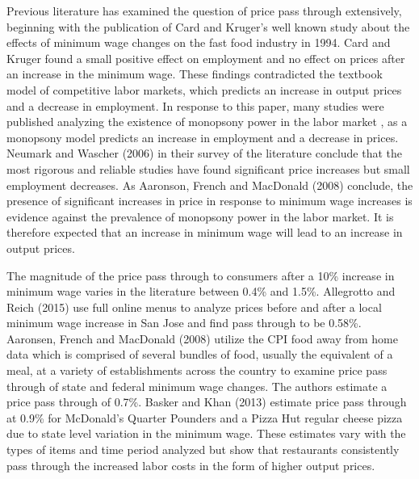 \documentclass[11pt]{article}
\begin{document}
Previous literature has examined the question of price pass through extensively, beginning with the publication of Card and Kruger's well known study about the effects of minimum wage changes on the fast food industry in 1994\nocite{card1994minimum}. Card and Kruger found a small positive effect on employment and no effect on prices after an increase in the minimum wage. These findings contradicted the textbook model of competitive labor markets, which predicts an increase in output prices and a decrease in employment. In response to this paper, many studies were published analyzing the existence of monopsony power in the labor market \cite{manning1995we, rebitzer1995consequences, burdett1998wage, bhaskar1999minimum}, as a monopsony model predicts an increase in employment and a decrease in prices. Neumark and Wascher (2006)\nocite{neumark2006minimum} in their survey of the literature conclude that the most rigorous and reliable studies have found significant price increases but small employment decreases. As Aaronson, French and MacDonald (2008) conclude\nocite{aaronson2008minimum}, the presence of significant increases in price in response to minimum wage increases is evidence against the prevalence of monopsony power in the labor market. It is therefore expected that an increase in minimum wage will lead to an increase in output prices.

The magnitude of the price pass through to consumers after a 10\% increase in minimum wage varies in the literature between 0.4\% and 1.5\%. Allegrotto and Reich (2015) use full online menus to analyze prices before and after a local minimum wage increase in San Jose and find pass through to be 0.58\%. Aaronsen, French and MacDonald (2008) utilize the CPI food away from home data which is comprised of several bundles of food, usually the equivalent of a meal, at a variety of establishments across the country to examine price pass through of state and federal minimum wage changes. The authors estimate a price pass through of 0.7\%. Basker and Khan (2013) estimate price pass through at 0.9\% for McDonald's Quarter Pounders and a Pizza Hut regular cheese pizza due to state level variation in the minimum wage. These estimates vary with the types of items and time period analyzed but show that restaurants consistently pass through the increased labor costs in the form of higher output prices. 
\end{document}
